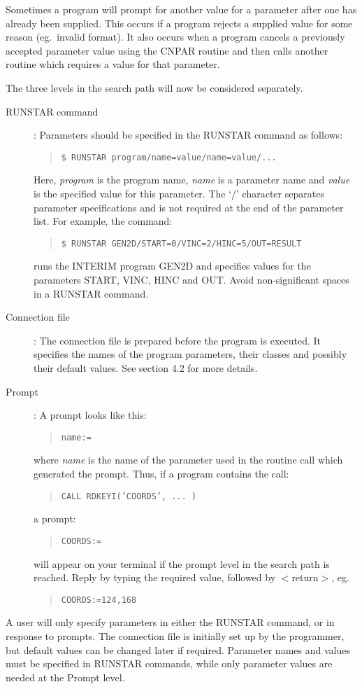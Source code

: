 \documentclass{article}
\begin{document}
Sometimes a program will prompt for another value for a parameter after one has
already been supplied.
This occurs if a program rejects a supplied value for some reason (eg.\ invalid
format).
It also occurs when a program cancels a previously accepted parameter value
using the CNPAR routine and then calls another routine which requires a value
for that parameter.

The three levels in the search path will now be considered separately.
\begin{description}
\item [RUNSTAR command]:
Parameters should be specified in the RUNSTAR command as follows:
\begin{quote}
{\tt \$ RUNSTAR program/name=value/name=value/...}
\end{quote}
Here, {\em program} is the program name, {\em name} is a parameter name and
{\em value} is the specified value for this parameter.
The `/' character separates parameter specifications and is not required at the
end of the parameter list.
For example, the command:
\begin{quote}
{\tt \$ RUNSTAR GEN2D/START=0/VINC=2/HINC=5/OUT=RESULT}
\end{quote}
runs the INTERIM program GEN2D and specifies values for the parameters
START, VINC, HINC and OUT.
Avoid non-significant spaces in a RUNSTAR command.
\item [Connection file]:
The connection file is prepared before the program is executed.
It specifies the names of the program parameters, their classes and possibly
their default values.
See section 4.2 for more details.
\item [Prompt]:
A prompt looks like this:
\begin{quote}
{\tt name:=}
\end{quote}
where {\em name} is the name of the parameter used in the routine call which
generated the prompt.
Thus, if a program contains the call:
\begin{quote}
{\tt CALL RDKEYI('COORDS', ... )}
\end{quote}
a prompt:
\begin{quote}
{\tt COORDS:=}
\end{quote}
will appear on your terminal if the prompt level in the search path is reached.
Reply by typing the required value, followed by $<$return$>$, eg.
\begin{quote}
{\tt COORDS:=124,168}
\end{quote}
\end{description}
A user will only specify parameters in either the RUNSTAR command, or in
response to prompts.
The connection file is initially set up by the programmer, but default values
can be changed later if required.
Parameter names and values must be specified in RUNSTAR commands, while only
parameter values are needed at the Prompt level.
\end{document}
